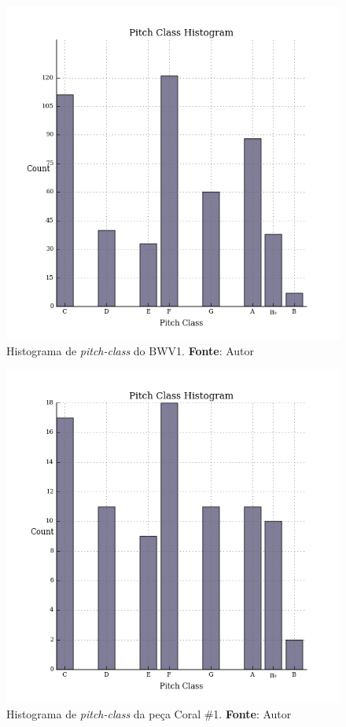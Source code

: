 \begin{figure}[!h]
  \centering
  \includegraphics[scale=0.71]{../analysis/bwv1/pitch-class.png}
  \caption{Histograma de \emph{pitch-class} do BWV1. \textbf{Fonte}: Autor}
    \label{fig:pitch-class-bwv1-histogram}
\end{figure}

\begin{figure}[!h]
  \centering
  \includegraphics[scale=0.71]{../analysis/bwv1/pitch-class-1.png}
  \caption{Histograma de \emph{pitch-class} da peça Coral \#1. \textbf{Fonte}: Autor}
    \label{fig:pitch-class-bwv1-histogram-2}
\end{figure}

